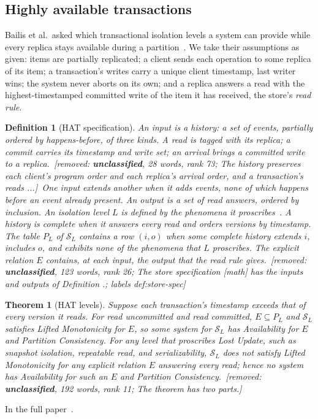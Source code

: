 \documentclass[sigconf]{cidr-2027}
\makeatletter
\newtheorem{theorem}{Theorem}
\newtheorem{definition}{Definition}
\theoremstyle{remark}
\newcommand{\inrel}{extends\xspace}          %
\newcommand{\Spec}{\mathcal{S}}
\newcommand{\proofinfull}{\par\pushQED{\qed}\normalfont\topsep2\p@\relax
  \trivlist\item[\@proofindent\hskip\labelsep{\@proofnamefont\proofname\@addpunct{.}}]%
  \ignorespaces In the full paper~\cite{hellerstein2026completecalmfull}.%
  \popQED\endtrivlist\@endpefalse}
\newcommand{\removednote}[1]{{\color{cutred}\footnotesize\,[removed: #1]\,}}
\makeatother
\begin{document}
\subsection{Highly available transactions}
\label{sec:hat-instance}

\textcolor{newblue}{Bailis et al.\ asked which transactional isolation levels a system can provide
while every replica stays available during a partition~\cite{bailis2013hat}.} \textcolor{newblue}{We take their assumptions as given:
items are partially replicated; a client sends each operation to some replica
of its item; a transaction's writes carry a unique client timestamp, last
writer wins; the system never aborts on its own; and a replica answers a read
with the highest-timestamped committed write of the item it has received, the
store's \emph{read rule}.}

\begin{definition}[HAT specification]
\label{def:hat-spec}
\textcolor{newblue}{An input is a history: a set of events, partially ordered by happens-before,
of three kinds.} \textcolor{newblue}{A read is tagged with its replica; a commit carries its
timestamp and write set; an arrival brings a committed write to a replica.} \removednote{\textbf{unclassified}, 28 words, rank 73; \textit{The history preserves each client's program order and each replica's arrival order, and a transaction's reads ...}} One
input \inrel another when it adds events, none of which happens before an event
already present. An output is a set of read answers, ordered by inclusion. \textcolor{newblue}{An
isolation level $L$ is defined by the phenomena it
proscribes~\cite{adya1999weakconsistency}.} A history is \emph{complete} when it answers every read and orders versions by
timestamp. \textcolor{newblue}{The table $P_L$ of $\Spec_L$ contains a row $(i,o)$ when some
complete history extends $i$, includes $o$, and exhibits none of the phenomena
that $L$ proscribes.} The explicit relation $E$
contains, at each input, the output that the read rule gives. \removednote{\textbf{unclassified}, 123 words, rank 26; \textit{The store specification [math] has the inputs and outputs of Definition .}; labels def:store-spec}
\end{definition}

\begin{theorem}[HAT levels]
\label{thm:hat-levels}
Suppose each transaction's timestamp exceeds that of every version it reads. \textcolor{newblue}{For read uncommitted and read committed, $E\subseteq P_L$ and $\Spec_L$
satisfies Lifted Monotonicity for $E$, so some system for $\Spec_L$ has
Availability for $E$ and Partition Consistency.} \textcolor{newblue}{For any level that proscribes
Lost Update, such as snapshot isolation, repeatable read, and serializability, $\Spec_L$ does not satisfy Lifted Monotonicity for any explicit relation $E$ answering every read; hence no system has Availability for such an $E$ and Partition Consistency.} \removednote{\textbf{unclassified}, 192 words, rank 11; \textit{The theorem has two parts.}}
\end{theorem}
\textcolor{newblue}{\proofinfull}
\end{document}
